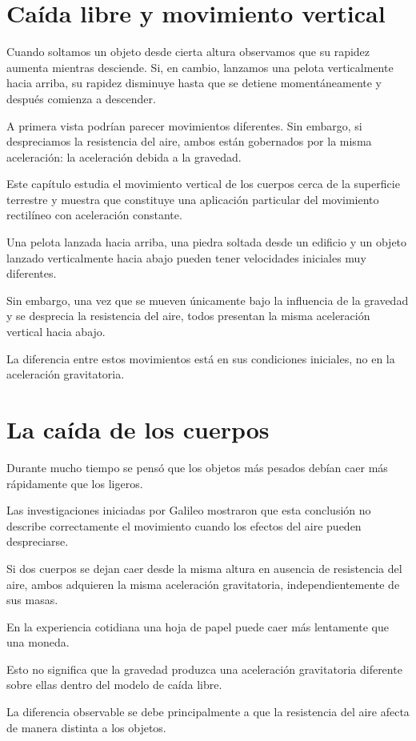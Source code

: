 ﻿\section{Caída libre y movimiento vertical}

Cuando soltamos un objeto desde cierta altura observamos que su rapidez aumenta mientras desciende. Si, en cambio, lanzamos una pelota verticalmente hacia arriba, su rapidez disminuye hasta que se detiene momentáneamente y después comienza a descender.

A primera vista podrían parecer movimientos diferentes. Sin embargo, si despreciamos la resistencia del aire, ambos están gobernados por la misma aceleración: la aceleración debida a la gravedad.

Este capítulo estudia el movimiento vertical de los cuerpos cerca de la superficie terrestre y muestra que constituye una aplicación particular del movimiento rectilíneo con aceleración constante.

\begin{idea}
Una pelota lanzada hacia arriba, una piedra soltada desde un edificio y un objeto lanzado verticalmente hacia abajo pueden tener velocidades iniciales muy diferentes.

Sin embargo, una vez que se mueven únicamente bajo la influencia de la gravedad y se desprecia la resistencia del aire, todos presentan la misma aceleración vertical hacia abajo.

La diferencia entre estos movimientos está en sus condiciones iniciales, no en la aceleración gravitatoria.
\end{idea}


\section{La caída de los cuerpos}

Durante mucho tiempo se pensó que los objetos más pesados debían caer más rápidamente que los ligeros.

Las investigaciones iniciadas por Galileo mostraron que esta conclusión no describe correctamente el movimiento cuando los efectos del aire pueden despreciarse.

Si dos cuerpos se dejan caer desde la misma altura en ausencia de resistencia del aire, ambos adquieren la misma aceleración gravitatoria, independientemente de sus masas.

\begin{interpretacion}
En la experiencia cotidiana una hoja de papel puede caer más lentamente que una moneda.

Esto no significa que la gravedad produzca una aceleración gravitatoria diferente sobre ellas dentro del modelo de caída libre.

La diferencia observable se debe principalmente a que la resistencia del aire afecta de manera distinta a los objetos.
\end{interpretacion}

